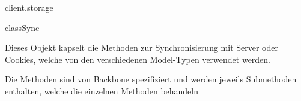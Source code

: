 \begin{texdocpackage}{client.storage}
\label{texdoclet:edu.kit.informatik.studyplan.client.storage}

\begin{texdocclass}{class}{Sync}
\label{texdoclet:edu.kit.informatik.studyplan.client.storage.Sync}
\begin{texdocclassintro}
Dieses Objekt kapselt die Methoden zur Synchronisierung mit Server oder
 Cookies, welche von den verschiedenen Model-Typen verwendet werden.\texdocbr{}

 Die Methoden sind von Backbone spezifiziert und werden jeweils Submethoden
 enthalten, welche die einzelnen Methoden behandeln\end{texdocclassintro}
\begin{texdocclassconstructors}
\end{texdocclassconstructors}
\begin{texdocclassmethods}
\end{texdocclassmethods}
\end{texdocclass}


\end{texdocpackage}



